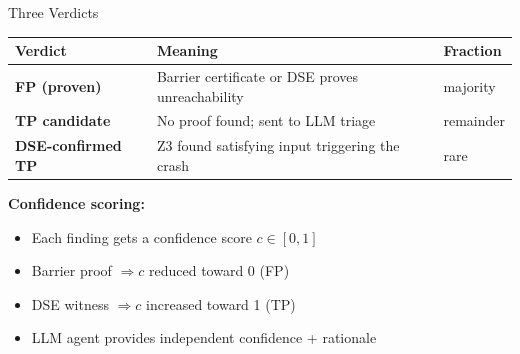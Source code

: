 \documentclass[aspectratio=169]{beamer}
\begin{document}
\begin{frame}{Three Verdicts}

\begin{center}
\begin{tabular}{lll}
\textbf{Verdict} & \textbf{Meaning} & \textbf{Fraction} \\
\hline
\textcolor{msgreen}{\textbf{FP (proven)}} & Barrier certificate or DSE proves unreachability & majority \\
\textcolor{msorange}{\textbf{TP candidate}} & No proof found; sent to LLM triage & remainder \\
\textcolor{msred}{\textbf{DSE-confirmed TP}} & Z3 found satisfying input triggering the crash & rare \\
\end{tabular}
\end{center}

\vspace{1em}
\textbf{Confidence scoring:}
\begin{itemize}
  \item Each finding gets a confidence score $c \in [0, 1]$
  \item Barrier proof $\Rightarrow c$ reduced toward 0 (FP)
  \item DSE witness $\Rightarrow c$ increased toward 1 (TP)
  \item LLM agent provides independent confidence + rationale
\end{itemize}

\end{frame}
\end{document}

